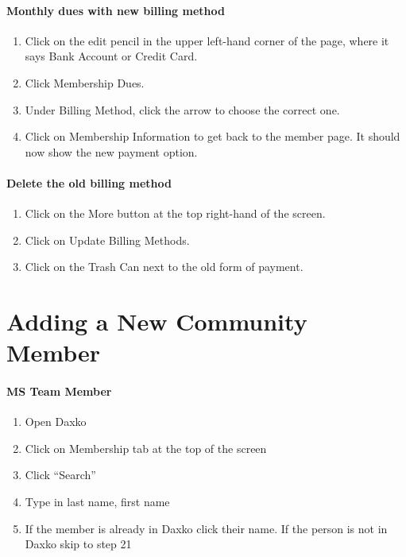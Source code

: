 \documentclass[
]{report}
\providecommand{\tightlist}{%
  \setlength{\itemsep}{0pt}\setlength{\parskip}{0pt}}\usepackage{longtable,booktabs,array}
\begin{document}
\hypertarget{monthly-dues-with-new-billing-method}{%
\subsubsection{Monthly dues with new billing
method}\label{monthly-dues-with-new-billing-method}}

\begin{enumerate}
\def\labelenumi{\arabic{enumi}.}
\setcounter{enumi}{9}
\tightlist
\item
  Click on the edit pencil in the upper left-hand corner of the page,
  where it says Bank Account or Credit Card.
\item
  Click Membership Dues.
\item
  Under Billing Method, click the arrow to choose the correct one.
\item
  Click on Membership Information to get back to the member page. It
  should now show the new payment option.
\end{enumerate}

\hypertarget{delete-the-old-billing-method}{%
\subsubsection{Delete the old billing
method}\label{delete-the-old-billing-method}}

\begin{enumerate}
\def\labelenumi{\arabic{enumi}.}
\setcounter{enumi}{13}
\tightlist
\item
  Click on the More button at the top right-hand of the screen.
\item
  Click on Update Billing Methods.
\item
  Click on the Trash Can next to the old form of payment.
\end{enumerate}

\hypertarget{adding-a-new-community-member}{%
\chapter{Adding a New Community
Member}\label{adding-a-new-community-member}}

\hypertarget{ms-team-member-3}{%
\subsubsection{MS Team Member}\label{ms-team-member-3}}

\begin{enumerate}
\def\labelenumi{\arabic{enumi}.}
\tightlist
\item
  Open Daxko
\item
  Click on Membership tab at the top of the screen
\item
  Click ``Search''
\item
  Type in last name, first name
\item
  If the member is already in Daxko click their name. If the person is
  not in Daxko skip to step 21
\end{enumerate}
\end{document}
